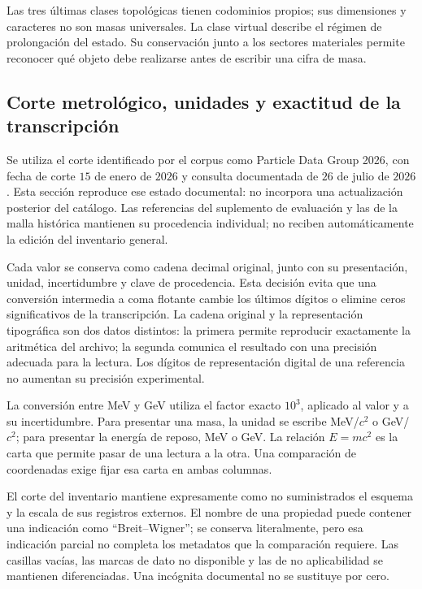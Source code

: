 \endgroup

Las tres últimas clases topológicas tienen codominios propios; sus
dimensiones y caracteres no son masas universales. La clase virtual
describe el régimen de prolongación del estado. Su conservación junto a
los sectores materiales permite reconocer qué objeto debe realizarse antes
de escribir una cifra de masa.

\subsection{Corte metrológico, unidades y exactitud de la transcripción}
\label{subsec:vi-corte-metrologico}

Se utiliza el corte identificado por el corpus como Particle Data Group
2026, con fecha de corte \(15\) de enero de \(2026\) y consulta
documentada de \(26\) de julio de \(2026\). Esta sección reproduce ese
estado documental: no incorpora una actualización posterior del catálogo.
Las referencias del suplemento de evaluación y las de la malla histórica
mantienen su procedencia individual; no reciben automáticamente la edición
del inventario general.

Cada valor se conserva como cadena decimal original, junto con su
presentación, unidad, incertidumbre y clave de procedencia. Esta decisión
evita que una conversión intermedia a coma flotante cambie los últimos
dígitos o elimine ceros significativos de la transcripción. La cadena
original y la representación tipográfica son dos datos distintos: la
primera permite reproducir exactamente la aritmética del archivo; la
segunda comunica el resultado con una precisión adecuada para la lectura.
Los dígitos de representación digital de una referencia no aumentan su
precisión experimental.

La conversión entre MeV y GeV utiliza el factor exacto \(10^3\), aplicado
al valor y a su incertidumbre. Para presentar una masa, la unidad se escribe
MeV/\(c^2\) o GeV/\(c^2\); para presentar la energía de reposo,
MeV o GeV. La relación \(E=mc^2\) es la carta que permite pasar de una
lectura a la otra. Una comparación de coordenadas exige fijar esa carta en
ambas columnas.

El corte del inventario mantiene expresamente como no suministrados el
esquema y la escala de sus registros externos. El nombre de una propiedad
puede contener una indicación como ``Breit--Wigner''; se conserva literalmente,
pero esa indicación parcial no completa los metadatos que la comparación
requiere. Las casillas vacías, las marcas de dato no disponible y las de
no aplicabilidad se mantienen diferenciadas. Una incógnita documental
no se sustituye por cero.

